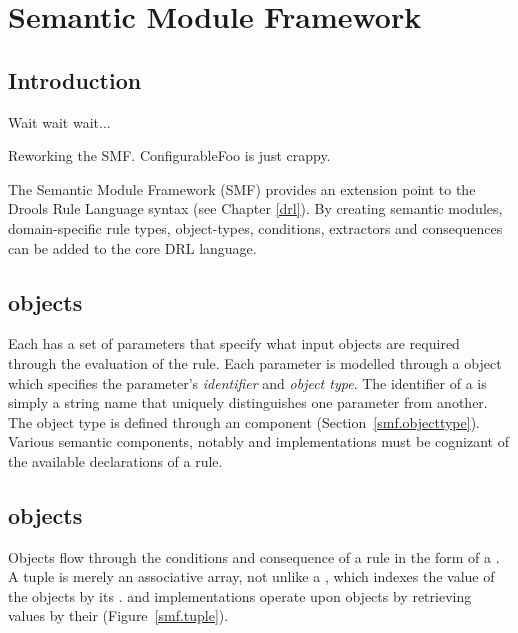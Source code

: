 \chapter{Semantic Module Framework}
\label{smf}

\section{Introduction}

\begin{implnote}
Wait wait wait...

Reworking the SMF.  ConfigurableFoo is just crappy.
\end{implnote}

The Semantic Module Framework (SMF)
provides an extension point to the Drools Rule Language syntax
(see Chapter \vref{drl}).  By creating semantic modules,
domain-specific rule types, object-types, conditions, extractors and consequences
can be added to the core DRL language.

\section{ objects}
\label{smf.declaration}

Each  has a set of parameters that specify what input objects
are required through the evaluation of the rule.  Each parameter is
modelled through a  object which specifies the
parameter's \emph{identifier} and \emph{object type}.  The
identifier of a  is simply a string name that
uniquely distinguishes one parameter from another.  The object type
is defined through an  component
(Section~\vref{smf.objecttype}).  Various semantic components, notably
 and  implementations
must be cognizant of the available declarations of a rule.

\section{ objects}

Objects flow through the conditions and consequence of a rule in the
form of a .  A tuple is merely an associative
array, not unlike a , which indexes the value of
the objects by its .   and
 implementations operate upon  objects
by retrieving values by their 
(Figure~\vref{smf.tuple}).

